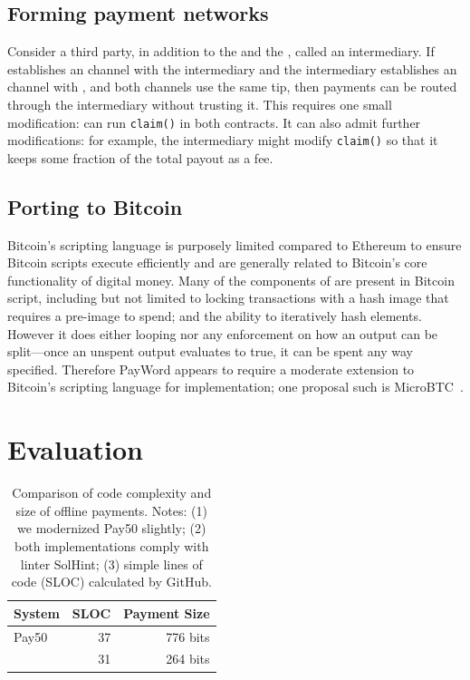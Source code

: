 \subsection{Forming payment networks} 

Consider a third party, in addition to the \make and the \take, called an intermediary. If \make establishes an \ew channel with the intermediary and the intermediary establishes an \ew channel with \take, and both channels use the same tip, then payments can be routed through the intermediary without trusting it. This requires one small modification: \take can run \texttt{claim()} in both contracts. It can also admit further modifications: for example, the intermediary might modify \texttt{claim()} so that it keeps some fraction of the total payout as a fee.

\subsection{Porting to Bitcoin}

Bitcoin's scripting language is purposely limited compared to Ethereum to ensure Bitcoin scripts execute efficiently and are generally related to Bitcoin's core functionality of digital money. Many of the components of \pw are present in Bitcoin script, including but not limited to locking transactions with a hash image that requires a pre-image to spend; and the ability to iteratively hash elements. However it does either looping nor any enforcement on how an output can be split---\ie once an unspent output evaluates to true, it can be spent any way specified. Therefore PayWord appears to require a moderate extension to Bitcoin's scripting language for implementation; one proposal such is MicroBTC~\cite{Wan18}.


\section{Evaluation}

\begin{table}[t]          
\centering
\begin{tabular}{ l | r | r }
System 		& SLOC 	& Payment Size 	  \\ \hline
\textsf{Pay50} 	& 37  	& 776 bits  		  \\
\eww 		& 31		& 264 bits  		  \\ 
\end{tabular}
\caption{Comparison of code complexity and size of offline payments. Notes: (1) we modernized \textsf{Pay50} slightly; (2) both implementations comply with linter SolHint; (3) simple lines of code (SLOC) calculated by GitHub.\label{table:loc}}
\end{table}

